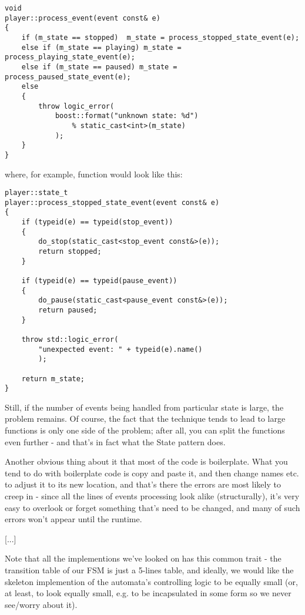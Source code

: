 \documentclass{netobjectdays}
\begin{document}
{\footnotesize
\begin{verbatim}
void
player::process_event(event const& e)
{
    if (m_state == stopped)  m_state = process_stopped_state_event(e);
    else if (m_state == playing) m_state = process_playing_state_event(e);
    else if (m_state == paused) m_state = process_paused_state_event(e);
    else
    {
        throw logic_error(
            boost::format("unknown state: %d")
                % static_cast<int>(m_state)
            );
    }
}
\end{verbatim}
}

where, for example,  
function would look like this:

{\footnotesize
\begin{verbatim}
player::state_t
player::process_stopped_state_event(event const& e)
{
    if (typeid(e) == typeid(stop_event))
    {
        do_stop(static_cast<stop_event const&>(e));
        return stopped;
    }

    if (typeid(e) == typeid(pause_event))
    {
        do_pause(static_cast<pause_event const&>(e));
        return paused;
    }

    throw std::logic_error(
        "unexpected event: " + typeid(e).name()
        );

    return m_state;
}
\end{verbatim}
}

Still, if the number of events being handled from particular 
state is large, the problem remains. Of course, the fact that 
the technique tends to lead to large functions is only one 
side of the problem; after all, you can split the functions 
even further - and that's in fact what the State pattern does.

Another obvious thing about it that most of the code is 
boilerplate. What you tend to do with boilerplate code is copy 
and paste it, and then change names etc. to adjust it to its new 
location, and that's there the errors are most likely to creep in
- since all the lines of events processing look alike 
(structurally), it's very easy to overlook or forget something 
that's need to be changed, and many of such errors won't appear 
until the runtime.

[...]

Note that all the implementions we've looked on has this common 
trait - the transition table of our FSM is just a 5-lines table, 
and ideally, we would like the skeleton implemention of the 
automata's controlling logic to be equally small (or, at least, 
to look equally small, e.g. to be incapsulated in some form so 
we never see/worry about it). 
\end{document}
